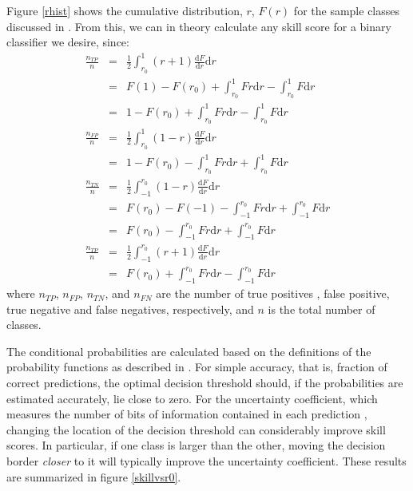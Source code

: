 \documentclass{article}
\begin{document}
Figure \ref{rhist} shows the cumulative distribution,
$r$, $F(r)$ for the sample classes discussed in \citet{Mills2011}.  
From this, we can in theory
calculate any skill score for a binary classifier we desire, since:
\begin{eqnarray}
\frac{n_{TP}}{n} & = & \frac{1}{2}\int_{r_0}^{1} (r+1) 
		\frac{\mathrm d F}{\mathrm d r} \mathrm d r \\
		& = & F(1) - F(r_0) + 
		\int_{r_0}^{1} F r \mathrm d r - \int_{r_0}^{1} F \mathrm d r \\
		& = & 1 - F(r_0) + \int_{r_0}^{1} F r \mathrm d r - \int_{r_0}^{1} F \mathrm d r \\
\frac{n_{FP}}{n} & = & \frac{1}{2}\int_{r_0}^{1} (1-r) 
		\frac{\mathrm d F}{\mathrm d r} \mathrm d r \\
		& = & 1 - F(r_0) - 
		\int_{r_0}^{1} F r \mathrm d r + \int_{r_0}^{1} F \mathrm d r \\
\frac{n_{TN}}{n} & = & \frac{1}{2}\int_{-1}^{r_0} (1-r) 
		\frac{\mathrm d F}{\mathrm d r} \mathrm d r \\
	& = & F(r_0) - F(-1) -
		\int_{-1}^{r_0} F r \mathrm d r + \int_{-1}^{r_0} F \mathrm d r \\
	& = & F(r_0) - \int_{-1}^{r_0} F r \mathrm d r + \int_{-1}^{r_0} F \mathrm d r \\
\frac{n_{TP}}{n} & = & \frac{1}{2}\int_{-1}^{r_0} (r+1) 
		\frac{\mathrm d F}{\mathrm d r} \mathrm d r \\
	& = & F(r_0) + \int_{-1}^{r_0} F r \mathrm d r - \int_{-1}^{r_0} F \mathrm d r 
\end{eqnarray}
where $n_{TP}$, $n_{FP}$, $n_{TN}$, and $n_{FN}$ are the number of true positives
, false positive, true negative and false negatives, respectively, and $n$
is the total number of classes.

The conditional probabilities are calculated based on the definitions of the
probability functions as described in \citet{Mills2011}.  For simple
accuracy, that is, fraction of correct predictions, the optimal decision
threshold should, if the probabilities are estimated accurately,
lie close to zero.
For the uncertainty coefficient, which measures the
number of bits of information contained in each prediction
\citep{Shannon, Press_etal1992, Mills2011}, changing the location of the
decision threshold can considerably improve skill scores.  In particular,
if one class is larger than the other, moving the decision border 
{\it closer} to it will typically improve the uncertainty coefficient.
These results are summarized in figure \ref{skillvsr0}.
\end{document}
